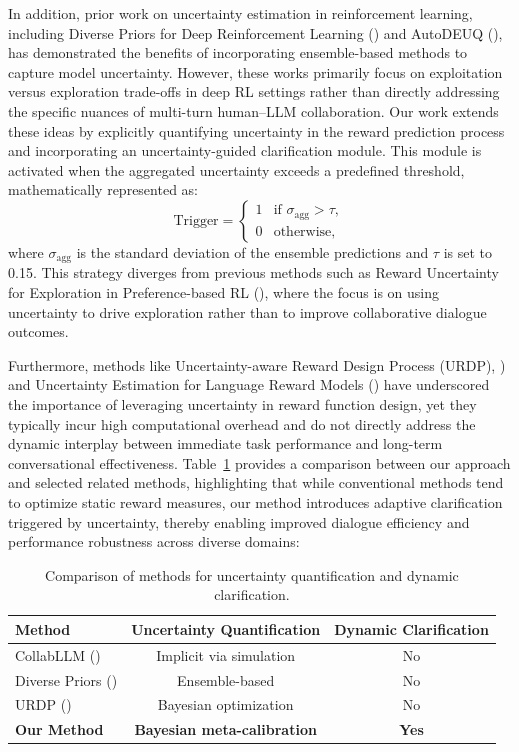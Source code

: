 \documentclass{article} %
\begin{document}
In addition, prior work on uncertainty estimation in reinforcement learning, including Diverse Priors for Deep Reinforcement Learning (\cite{weng2023diverse}) and AutoDEUQ (\cite{egele2021autodeuq}), has demonstrated the benefits of incorporating ensemble-based methods to capture model uncertainty. However, these works primarily focus on exploitation versus exploration trade-offs in deep RL settings rather than directly addressing the specific nuances of multi-turn human–LLM collaboration. Our work extends these ideas by explicitly quantifying uncertainty in the reward prediction process and incorporating an uncertainty-guided clarification module. This module is activated when the aggregated uncertainty exceeds a predefined threshold, mathematically represented as:
\[
\text{Trigger} = \begin{cases} 
1 & \text{if } \sigma_{\text{agg}} > \tau, \\
0 & \text{otherwise,}
\end{cases}
\]
where \(\sigma_{\text{agg}}\) is the standard deviation of the ensemble predictions and \(\tau\) is set to 0.15. This strategy diverges from previous methods such as Reward Uncertainty for Exploration in Preference-based RL (\cite{liang2022reward}), where the focus is on using uncertainty to drive exploration rather than to improve collaborative dialogue outcomes.

Furthermore, methods like Uncertainty-aware Reward Design Process (URDP),  \citep{yang2025uncertaintyaware}) and Uncertainty Estimation for Language Reward Models (\cite{gleave2022uncertainty}) have underscored the importance of leveraging uncertainty in reward function design, yet they typically incur high computational overhead and do not directly address the dynamic interplay between immediate task performance and long-term conversational effectiveness. Table~\ref{tab:comp} provides a comparison between our approach and selected related methods, highlighting that while conventional methods tend to optimize static reward measures, our method introduces adaptive clarification triggered by uncertainty, thereby enabling improved dialogue efficiency and performance robustness across diverse domains:

\begin{table}[h]
\centering
\begin{tabularx}{\textwidth}{|X|c|c|}
\hline
\textbf{Method} & \textbf{Uncertainty Quantification} & \textbf{Dynamic Clarification} \\
\hline
CollabLLM (\cite{wu2025collabllm}) & Implicit via simulation & No \\
\hline
Diverse Priors (\cite{weng2023diverse}) & Ensemble-based & No \\
\hline
URDP (\cite{yang2025uncertaintyaware}) & Bayesian optimization & No \\
\hline
\textbf{Our Method} & \textbf{Bayesian meta-calibration} & \textbf{Yes} \\
\hline
\end{tabularx}
\caption{Comparison of methods for uncertainty quantification and dynamic clarification.}
\label{tab:comp}
\end{table}
\end{document}
